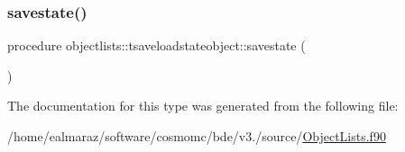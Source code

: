 \subsubsection{\texorpdfstring{savestate()}{savestate()}}
{\footnotesize\ttfamily procedure objectlists\+::tsaveloadstateobject\+::savestate (\begin{DoxyParamCaption}{ }\end{DoxyParamCaption})\hspace{0.3cm}{\ttfamily [private]}}



The documentation for this type was generated from the following file\+:\begin{DoxyCompactItemize}
\item 
/home/ealmaraz/software/cosmomc/bde/v3./source/\mbox{\hyperlink{ObjectLists_8f90}{Object\+Lists.\+f90}}\end{DoxyCompactItemize}
